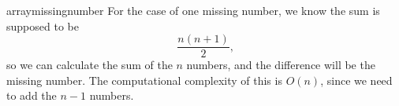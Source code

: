 \begin{answer}{arraymissingnumber}
For the case of one missing number, we know the sum is supposed to be
\[
  \frac{n (n+1) }{2}
  \text{,}
\]
so we can calculate the sum of the $n$ numbers, and the difference will be the missing number.
The computational complexity of this is $O(n)$, since we need to add the $n-1$ numbers.
\end{answer}